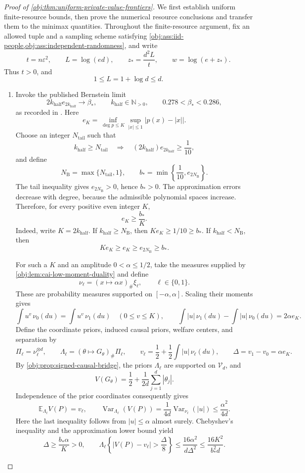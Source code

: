 \documentclass[11pt]{article}
\begin{document}
\begin{proof}[Proof of \cref{obj:thm:uniform-private-value-frontiers}]
We first establish uniform finite-resource bounds, then prove the numerical resource conclusions and transfer them to the minimax quantities. Throughout the finite-resource argument, fix an allowed tuple and a sampling scheme satisfying \cref{obj:ass:iid-people,obj:ass:independent-randomness}, and write
\[
t=n\varepsilon^2,\qquad L=\log(ed),\qquad
z_*=\frac{d^2L}{t},\qquad w=\log(e+z_*).
\]
Thus \(t>0\), and
\[
1\le L=1+\log d\le d.
\]

\begin{enumerate}
\item
Invoke the published Bernstein limit
\[
2k_{\mathrm{half}} e_{2k_{\mathrm{half}}}\longrightarrow\beta_*,
\qquad k_{\mathrm{half}}\in\mathbb N_{>0},
\qquad 0.278<\beta_*<0.286,
\]
as recorded in \citep[Section 3.1, p.~8]{CaiLow2011Nonsmooth}. Here
\[
e_K=\inf_{\deg p\le K}\sup_{|x|\le1}\bigl|p(x)-|x|\bigr|.
\]
Choose an integer \(N_{\mathrm{tail}}\) such that
\[
k_{\mathrm{half}}\ge N_{\mathrm{tail}}
\quad\Longrightarrow\quad
(2k_{\mathrm{half}})e_{2k_{\mathrm{half}}}\ge\frac1{10},
\]
and define
\[
N_{\mathrm B}=\max\{N_{\mathrm{tail}},1\},
\qquad
b_*=\min\left\{\frac1{10},e_{2N_{\mathrm B}}\right\}.
\]
The tail inequality gives \(e_{2N_{\mathrm B}}>0\), hence \(b_*>0\).
The approximation errors decrease with degree, because the admissible polynomial spaces increase. Therefore, for every positive even integer \(K\),
\[
e_K\ge\frac{b_*}{K}.
\]
Indeed, write \(K=2k_{\mathrm{half}}\). If \(k_{\mathrm{half}}\ge N_{\mathrm B}\), then \(Ke_K\ge1/10\ge b_*\). If \(k_{\mathrm{half}}<N_{\mathrm B}\), then
\[
Ke_K\ge e_K\ge e_{2N_{\mathrm B}}\ge b_*.
\]

For such a \(K\) and an amplitude \(0<\alpha\le1/2\), take the measures supplied by \cref{obj:lem:cai-low-moment-duality} and define
\[
\nu_\ell=(x\mapsto\alpha x)_{\#}\xi_\ell,
\qquad \ell\in\{0,1\}.
\]
These are probability measures supported on \([-\alpha,\alpha]\). Scaling their moments gives
\[
\int u^v\,\nu_0(du)=\int u^v\,\nu_1(du)
\quad(0\le v\le K),
\qquad
\int |u|\,\nu_1(du)-\int |u|\,\nu_0(du)
=2\alpha e_K.
\]
Define the coordinate priors, induced causal priors, welfare centers, and separation by
\[
\Pi_\ell=\nu_\ell^{\otimes d},\qquad
\Lambda_\ell=(\theta\mapsto G_\theta)_{\#}\Pi_\ell,
\qquad
v_\ell=\frac12+\frac12\int|u|\,\nu_\ell(du),
\qquad
\Delta=v_1-v_0=\alpha e_K.
\]
By \cref{obj:prop:signed-causal-bridge}, the priors \(\Lambda_\ell\) are supported on \(\mathcal V_d\), and
\[
V(G_\theta)=\frac12+\frac1{2d}\sum_{j=1}^d|\theta_j|.
\]
Independence of the prior coordinates consequently gives
\[
\mathbb E_{\Lambda_\ell}V(P)=v_\ell,
\qquad
\operatorname{Var}_{\Lambda_\ell}(V(P))
=\frac1{4d}\operatorname{Var}_{\nu_\ell}(|u|)
\le\frac{\alpha^2}{4d}.
\]
Here the last inequality follows from \(|u|\le\alpha\) almost surely. Chebyshev's inequality and the approximation lower bound yield
\[
\Delta\ge\frac{b_*\alpha}{K}>0,
\qquad
\Lambda_\ell\!\left\{|V(P)-v_\ell|>\frac{\Delta}{8}\right\}
\le\frac{16\alpha^2}{d\Delta^2}
\le\frac{16K^2}{b_*^2d}.
\]


\end{enumerate}
\end{proof}
\end{document}
